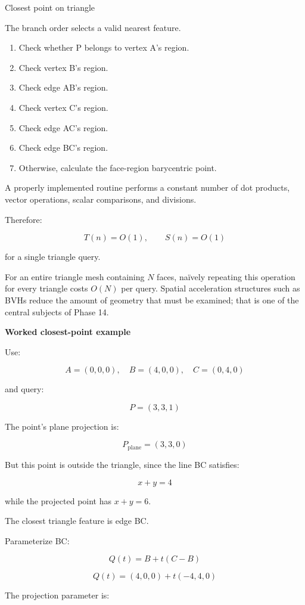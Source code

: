 Closest point on triangle

The branch order selects a valid nearest feature.

\begin{enumerate}
\def\labelenumi{\arabic{enumi}.}
\tightlist
\item
  Check whether P belongs to vertex A's region.
\item
  Check vertex B's region.
\item
  Check edge AB's region.
\item
  Check vertex C's region.
\item
  Check edge AC's region.
\item
  Check edge BC's region.
\item
  Otherwise, calculate the face-region barycentric point.
\end{enumerate}

A properly implemented routine performs a constant number of dot products, vector operations, scalar comparisons, and divisions.

Therefore:

\[
T(n)=O(1),\qquad S(n)=O(1)
\]

for a single triangle query.

For an entire triangle mesh containing \(N\) faces, naïvely repeating this operation for every triangle costs \(O(N)\) per query. Spatial acceleration structures such as BVHs reduce the amount of geometry that must be examined; that is one of the central subjects of Phase 14.

\textbf{Worked closest-point example}

Use:

\[
A=(0,0,0),\quad B=(4,0,0),\quad C=(0,4,0)
\]

and query:

\[
P=(3,3,1)
\]

The point's plane projection is:

\[
P_{\mathrm{plane}}=(3,3,0)
\]

But this point is outside the triangle, since the line BC satisfies:

\[
x+y=4
\]

while the projected point has \(x+y=6\).

The closest triangle feature is edge BC.

Parameterize BC:

\[
Q(t)=B+t(C-B)
\]

\[
Q(t)=(4,0,0)+t(-4,4,0)
\]

The projection parameter is:


